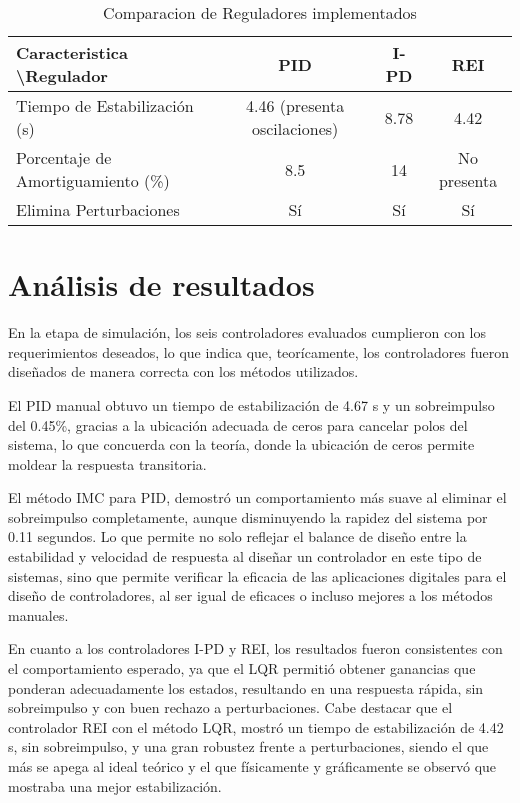 \documentclass[conference,onecolumn,12pt]{IEEEtran}
\numberwithin{equation}{subsection}
\begin{document}
\begin{table}[htbp]
\centering
\caption{Comparacion de Reguladores implementados}
\label{tab:comp_reg}
\begin{tabular}{|l|c|c|c|}
\hline
Caracteristica \textbackslash Regulador & PID              & I-PD & REI         \\ \hline
Tiempo de Estabilización (s)            & 4.46 (presenta oscilaciones) & 8.78 & 4.42        \\ \hline
Porcentaje de Amortiguamiento (\%)      & 8.5              & 14   & No presenta \\ \hline
Elimina Perturbaciones                  & Sí               & Sí   & Sí          \\ \hline
\end{tabular}
\end{table}

\newpage

\section{Análisis de resultados}

En la etapa de simulación, los seis controladores evaluados cumplieron con los requerimientos deseados, lo que indica que, teorícamente, los controladores fueron diseñados de manera correcta con los métodos utilizados.

El PID manual obtuvo un tiempo de estabilización de 4.67 s y un sobreimpulso del 0.45\%, gracias a la ubicación adecuada de ceros para cancelar polos del sistema, lo que concuerda con la teoría, donde la ubicación de ceros permite moldear la respuesta transitoria. 

El método IMC para PID, demostró un comportamiento más suave al eliminar el sobreimpulso completamente, aunque disminuyendo la rapidez del sistema por 0.11 segundos. Lo que permite no solo reflejar el balance de diseño entre la estabilidad y velocidad de respuesta al diseñar un controlador en este tipo de sistemas, sino que permite verificar la eficacia de las aplicaciones digitales para el diseño de controladores, al ser igual de eficaces o incluso mejores a los métodos manuales.

En cuanto a los controladores I-PD y REI, los resultados fueron consistentes con el comportamiento esperado, ya que el LQR permitió obtener ganancias que ponderan adecuadamente los estados, resultando en una respuesta rápida, sin sobreimpulso y con buen rechazo a perturbaciones. Cabe destacar que el controlador REI con el método LQR, mostró un tiempo de estabilización de 4.42 s, sin sobreimpulso, y una gran robustez frente a perturbaciones, siendo el que más se apega al ideal teórico y el que físicamente y gráficamente se observó que mostraba una mejor estabilización.
\end{document}
